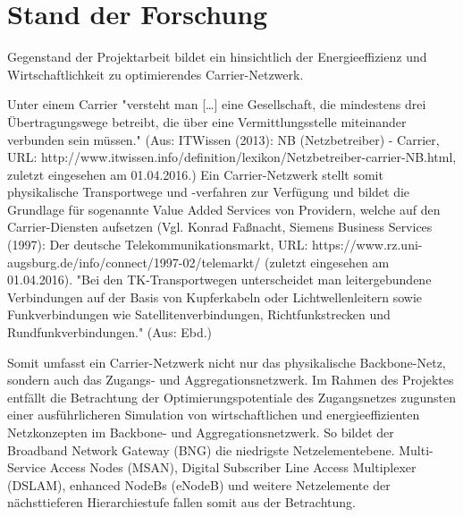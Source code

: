\documentclass[12pt,titlepage]{article}
\newcommand{\firstpages}{

     \newpage
     \tableofcontents{}
     \addtocontents{toc}{~\hfill\textbf{Seite}\par}

     \newpage
     \listoffigures

     \newpage
     \listoftables
     \newpage
}
\begin{document}
\firstpages
\twocolumn
\section{Stand der Forschung}
Gegenstand der Projektarbeit bildet ein hinsichtlich der Energieeffizienz und Wirtschaftlichkeit zu optimierendes Carrier-Netzwerk.

Unter einem Carrier "versteht man […] eine Gesellschaft, die mindestens drei Übertragungswege betreibt, die über eine Vermittlungsstelle miteinander verbunden sein müssen." (Aus: ITWissen (2013): NB (Netzbetreiber) - Carrier, URL: http://www.itwissen.info/definition/lexikon/Netzbetreiber-carrier-NB.html, zuletzt eingesehen am 01.04.2016.) Ein Carrier-Netzwerk stellt somit physikalische Transportwege und -verfahren zur Verfügung und bildet die Grundlage für sogenannte Value Added Services von Providern, welche auf den Carrier-Diensten aufsetzen (Vgl. Konrad Faßnacht, Siemens Business Services (1997): Der deutsche Telekommunikationsmarkt, URL: https://www.rz.uni-augsburg.de/info/connect/1997-02/telemarkt/ (zuletzt eingesehen am 01.04.2016). "Bei den TK-Transportwegen unterscheidet man leitergebundene Verbindungen auf der Basis von Kupferkabeln oder Lichtwellenleitern sowie Funkverbindungen wie Satellitenverbindungen, Richtfunkstrecken und Rundfunkverbindungen." (Aus: Ebd.)

Somit umfasst ein Carrier-Netzwerk nicht nur das physikalische Backbone-Netz, sondern auch das Zugangs- und Aggregationsnetzwerk. Im Rahmen des Projektes entfällt die Betrachtung der Optimierungspotentiale des Zugangsnetzes zugunsten einer ausführlicheren Simulation von wirtschaftlichen und energieeffizienten Netzkonzepten im Backbone- und Aggregationsnetzwerk. So bildet der Broadband Network Gateway (BNG) die niedrigste Netzelementebene. Multi-Service Access Nodes (MSAN), Digital Subscriber Line Access Multiplexer (DSLAM), enhanced NodeBs (eNodeB) und weitere Netzelemente der nächsttieferen Hierarchiestufe fallen somit aus der Betrachtung.
\end{document}
